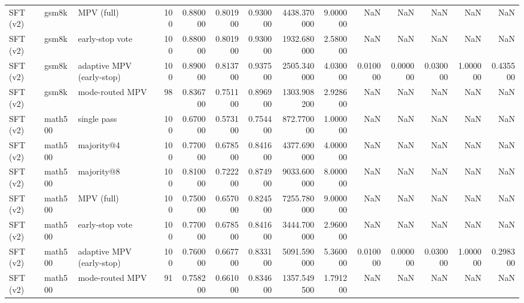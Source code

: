 \begin{table}
\begin{tabular}{lllrrrrrrrrrrr}
SFT (v2) & gsm8k & MPV (full) & 100 & 0.880000 & 0.801900 & 0.930000 & 4438.370000 & 9.000000 & NaN & NaN & NaN & NaN & NaN \\
SFT (v2) & gsm8k & early-stop vote & 100 & 0.880000 & 0.801900 & 0.930000 & 1932.680000 & 2.580000 & NaN & NaN & NaN & NaN & NaN \\
SFT (v2) & gsm8k & adaptive MPV (early-stop) & 100 & 0.890000 & 0.813700 & 0.937500 & 2505.340000 & 4.030000 & 0.010000 & 0.000000 & 0.030000 & 1.000000 & 0.435500 \\
SFT (v2) & gsm8k & mode-routed MPV & 98 & 0.836700 & 0.751100 & 0.896900 & 1303.908200 & 2.928600 & NaN & NaN & NaN & NaN & NaN \\
SFT (v2) & math500 & single pass & 100 & 0.670000 & 0.573100 & 0.754400 & 872.770000 & 1.000000 & NaN & NaN & NaN & NaN & NaN \\
SFT (v2) & math500 & majority@4 & 100 & 0.770000 & 0.678500 & 0.841600 & 4377.690000 & 4.000000 & NaN & NaN & NaN & NaN & NaN \\
SFT (v2) & math500 & majority@8 & 100 & 0.810000 & 0.722200 & 0.874900 & 9033.600000 & 8.000000 & NaN & NaN & NaN & NaN & NaN \\
SFT (v2) & math500 & MPV (full) & 100 & 0.750000 & 0.657000 & 0.824500 & 7255.780000 & 9.000000 & NaN & NaN & NaN & NaN & NaN \\
SFT (v2) & math500 & early-stop vote & 100 & 0.770000 & 0.678500 & 0.841600 & 3444.700000 & 2.960000 & NaN & NaN & NaN & NaN & NaN \\
SFT (v2) & math500 & adaptive MPV (early-stop) & 100 & 0.760000 & 0.667700 & 0.833100 & 5091.590000 & 5.360000 & 0.010000 & 0.000000 & 0.030000 & 1.000000 & 0.298300 \\
SFT (v2) & math500 & mode-routed MPV & 91 & 0.758200 & 0.661000 & 0.834600 & 1357.549500 & 1.791200 & NaN & NaN & NaN & NaN & NaN \\
\bottomrule
\end{tabular}
\end{table}
